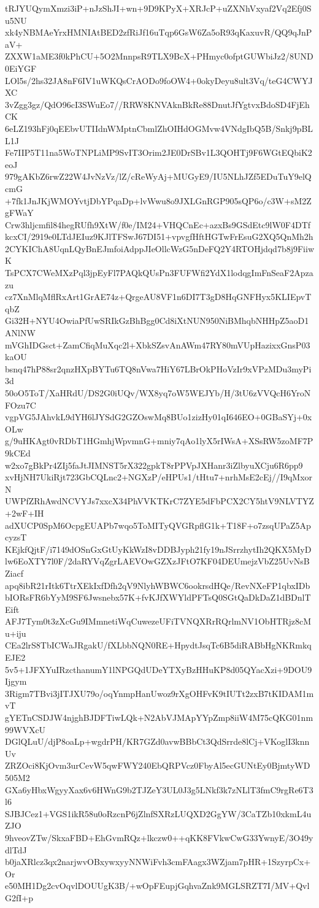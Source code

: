 tRJYUQymXmzi3iP+nJzShJI+wn+9D9KPyX+XRJcP+uZXNhVxyaf2Vq2Efj0Su5NU
xk4yNBMAeYrxHMNIAtBED2zfRiJf16uTqp6GsW6Za5oR93qKaxuvR/QQ9qJnPaV+
ZXXW1aME3f0kPhCU+5O2MnnpsR9TLX9BcX+PHmyc0ofptGUWbiJz2/8UND0EiYGF
LOl5s/2hs32JA8nF6IV1uWKQsCrAODo9foOW4+0okyDeyu8ult3Vq/teG4CWYJXC
3vZgg3gz/QdO96cI3SWuEo7//RRW8KNVAknBkRe88DnutJfYgtvxBdoSD4FjEhCK
6eLZ193hFj0qEEbvUTIIdnWMptnCbmlZhOIHdOGMvw4VNdgIbQ5B/Snkj9pBLL1J
Fe7IIP5T11na5WoTNPLiMP9SvIT3Orim2JE0DrSBv1L3QOHTj9F6WGtEQbiK2eoJ
979gAKbZ6rwZ22W4JvNzVz/lZ/cReWyAj+MUGyE9/IU5NLhJZf5EDuTuY9elQcmG
+7fk1JnJKjWMOYvtjDbYPqaDp+lvWwu8o9JXLGnRGP905sQP6o/c3W+sM2ZgFWaY
Crw3hljcmfil84hegRUfh9XtW/f0e/IM24+VHQCnEc+azxBs9GSdEtc9lW0F4DTf
kcxCI/2919e0LTdJEIuz9KJlTFSwJ67DI51+vpvgfHftHGTwFrEsuG2XQ5QnMh2h
2CYKIChA8UqnLQyBnEJmfoiAdppJIeOllcWzG5nDeFQ2Y4RTOHjdqd7b8j9FiiwK
TsPCX7CWeMXzPql3jpEyFl7PAQkQUsPn3FUFWfi2YdX1lodqgImFnSeaF2Apzazu
cz7XnMlqMflRxArt1GrAE74z+QrgeAU8VF1n6DI7T3gD8HqGNFHyx5KLIEpvTqbZ
Gi32H+NYU4OwiaPfUwSRIkGzBhBgg0Cd8iXtNUN950NiBMhqbNHHpZ5aoD1ANlNW
mVGhIDGsct+ZamCfiqMuXqc2l+XbkSZsvAnAWm47RY80mVUpHazixxGnsP03kaOU
bsnq47hP88sr2qnzHXpBYTu6TQ8nVwa7HiY67LBrOkPHoVzIr9xVPzMDu3myPi3d
50oO5ToT/XaHRdU/DS2G0iUQv/WX8yq7oW5WEJYb/H/3tU6zVVQcH6YroNFOzu7C
vgpVG5JAhvkL9dYH6lJYSdG2GZOswMq8BUo1zizHy01qI646EO+0GBaSYj+0xOLw
g/9uHKAgt0vRDbT1HGmhjWpvmnG+mniy7qAo1lyX5rIWsA+XSsRW5zoMF7P9kCEd
w2xo7gBkPr4ZIj5faJtJIMNST5rX322gpkT8rPPVpJXHanr3iZlbyuXCju6R6pp9
xvHjNH7UkiRjt723GbCQLnc2+NGXzP/eHPUs1/tHtu7+nrhMsE2cEj//I9qMxorN
UWPfZRhAwdNCVYJs7xxcX34PhVVKTKrC7ZYE5dFbPCX2CY5htV9NLVTYZ+2wF+IH
adXUCP0SpM6OcpgEUAPb7wqo5ToMITyQVGRpflG1k+T18F+o7zsqUPaZ5ApcyzsT
KEjkfQjtF/i7149dOSnGxGtUyKkWzI8vDDBJyph21fy19nJSrrzhytIh2QKX5MyD
lw6EoXTY7l0F/2daRYVqZgrLAEVOwGZXzJFtO7KF04DEUmejzVbZ25UvNsBZiacf
apq8ibR21rItk6TtrXEkIxfDfh2qV9NlyhWBWC6ookrsdHQe/RevNXeFP1qbxIDb
bIORsFR6bYyM9SF6Jwsnebx57K+fvKJfXWYldPFTsQ0SGtQaDkDaZ1dBDnlTEift
AFJ7Tym0t3zXcGu9IMmnetiWqCuwezeUFiTVNQXRrRQrlmNV1ObHTRjz8cMu+iju
CEa2lrS8TbICWaJRgakU/fXLbbNQN0RE+HpydtJsqTc6B5diRABbHgNKRmkqEJE2
5v5+1JFXYuIRzcthanumY1lNPGQdUDeYTXyBzHHuKP8d05QYacXzi+9DOU9Ijgym
3Rigm7TBvi3jITJXU79o/oqYnmpHanUwoz9rXgOHFvK9tIUTt2zxB7tKIDAM1mvT
gYETnCSDJW4njghBJDFTiwLQk+N2AbVJMApYYpZmp8iiW4M75cQKG01nm99WVXcU
DGlQLuU/djP8oaLp+wgdrPH/KR7GZd0avwBBbCt3QdSrrde8lCj+VKoglI3knnUv
ZRZOci8KjOvm3urCevW5qwFWY240EbQRPVcz0FbyAl5ecGUNtEy0BjmtyWD505M2
GXa6yHbxWgyyXax6v6HWnG9b2TJZeY3UL0J3g5LNkf3k7zNLlT3fmC9rgRe6T3l6
SJBJCez1+VGS1ikR58u0oRzcnP6jZlnfSXRzLUQXD2GgYW/3CaTZb10xkmL4uZJO
9hveovZTw/SkxaFBD+EhGvmRQz+lkczw0++qKK8FVkwCwG33YwnyE/3O49ydlTdJ
b0jaXRlcz3qx2narjwvOBxywxyyNNWiFvh3cmFAagx3WZjam7pHR+1SzyrpCx+Or
e50MH1Dg2cvOqvlDOUUgK3B/+wOpFEupjGqhvaZnk9MGLSRZT7I/MV+QvlG2fI+p

